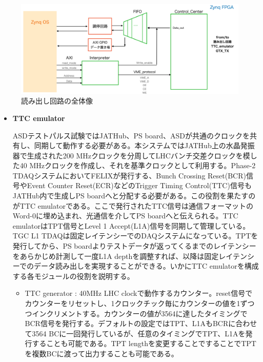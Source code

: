 \begin{figure} 
\centering
\includegraphics[width=16cm]{fig/QAQC/JAThubreadout.png}
\caption[読み出し回路の全体像]{読み出し回路の全体像}
\label{JATHubreadout}
\end{figure}

\begin{itemize}
    \item \textbf{TTC emulator} \par
    ASDテストパルス試験ではJATHub、PS board、ASDが共通のクロックを共有し、同期して動作する必要がある。本システムではJATHub上の水晶発振器で生成された200 MHzクロックを分周してLHCバンチ交差クロックを模した40 MHzクロックを作成し、それを基準クロックとして利用する。Phase-2 TDAQシステムにおいてFELIXが発行する、Bunch Crossing Reset(BCR)信号やEvent Counter Reset(ECR)などのTrigger Timing Control(TTC)信号もJATHub内で生成しPS boardへと分配する必要がある。この役割を果たすのがTTC emulatorである。ここで発行されたTTC信号は通信フォーマットのWord-0に埋め込まれ、光通信を介してPS boardへと伝えられる。TTC emulatorはTPT信号とLevel 1 Accept(L1A)信号を同期して管理している。TGC L1 TDAQは固定レイテンシーでのDAQシステムになっている。TPTを発行してから、PS boardよりテストデータが返ってくるまでのレイテンシーをあらかじめ計測して一度L1A depthを調整すれば、以降は固定レイテンシーでのデータ読み出しを実現することができる。いかにTTC emulatorを構成する各モジュールの役割を説明する。
    \baselineskip

    \begin{itemize}
        \item {TTC generator :} 40MHz LHC clockで動作するカウンター。reset信号でカウンターをリセットし、1クロックチック毎にカウンターの値を1ずつつインクリメントする。カウンターの値が3564に達したタイミングでBCR信号を発行する。デフォルトの設定ではTPT、L1AもBCRに合わせて3564 BCに一回発行しているが、任意のタイミングでTPT、L1Aを発行することも可能である。TPT lengthを変更することですることでTPTを複数BCに渡って出力することも可能である。
        \baselineskip


\end{itemize}
\end{itemize}
